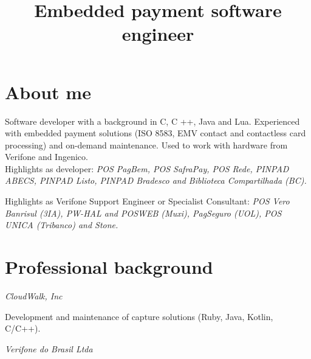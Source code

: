 \documentclass[11pt,a4paper,sans]{moderncv}
\title{\Large Embedded payment software\protect\\engineer}
\begin{document}
\maketitle

\section{About me}

\vspace{0.5mm}

\hspace{1.25cm} Software developer with a background in C, C ++, Java and Lua.
Experienced with embedded payment solutions (ISO 8583, EMV contact and
contactless card processing) and on-demand maintenance. Used to work with
hardware from Verifone and Ingenico.\protect\\

\hspace{1.25cm} Highlights as developer: \textit{POS PagBem, POS SafraPay, POS
Rede, PINPAD ABECS, PINPAD Listo, PINPAD Bradesco and Biblioteca Compartilhada
(BC).}

\hspace{1.25cm} Highlights as Verifone Support Engineer or Specialist
Consultant: \textit{POS Vero Banrisul (3IA), PW-HAL and POSWEB (Muxi),
PagSeguro (UOL), POS UNICA (Tribanco) and Stone.}

\section{Professional background}

\vspace{0.5mm}

\hspace{1.25cm} \textit{CloudWalk, Inc}


\hspace{1.25cm} \begin{minipage}[htb]{\linewidth - 1.25cm}
    Development and maintenance of capture solutions (Ruby, Java, Kotlin,
    C/C++).
\end{minipage}

\vspace{\baselineskip}

\hspace{1.25cm} \textit{Verifone do Brasil Ltda}
\end{document}
